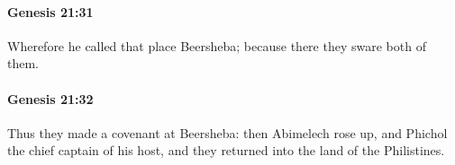 		\paragraph{Genesis 21:31} %
			\label{GENESIS-21-31}

			Wherefore he called that place Beersheba; because there they sware both of them.


		\paragraph{Genesis 21:32} %
			\label{GENESIS-21-32}

			Thus they made a covenant at Beersheba: then Abimelech rose up, and Phichol the chief captain of his host, and they returned into the land of the Philistines.


